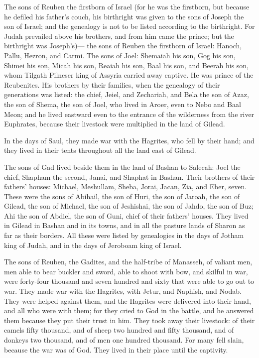  The sons of Reuben the firstborn of Israel (for he was the
firstborn, but because he defiled his father's couch, his birthright was
given to the sons of Joseph the son of Israel; and the genealogy is not
to be listed according to the birthright.  For Judah
prevailed above his brothers, and from him came the prince; but the
birthright was Joseph's)---  the sons of Reuben the
firstborn of Israel: Hanoch, Pallu, Hezron, and Carmi.  The
sons of Joel: Shemaiah his son, Gog his son, Shimei his son,
 Micah his son, Reaiah his son, Baal his son, 
and Beerah his son, whom Tilgath Pilneser king of Assyria carried away
captive. He was prince of the Reubenites.  His brothers by
their families, when the genealogy of their generations was listed: the
chief, Jeiel, and Zechariah,  and Bela the son of Azaz, the
son of Shema, the son of Joel, who lived in Aroer, even to Nebo and Baal
Meon;  and he lived eastward even to the entrance of the
wilderness from the river Euphrates, because their livestock were
multiplied in the land of Gilead.

 In the days of Saul, they made war with the Hagrites, who
fell by their hand; and they lived in their tents throughout all the
land east of Gilead.

 The sons of Gad lived beside them in the land of Bashan to
Salecah:  Joel the chief, Shapham the second, Janai, and
Shaphat in Bashan.  Their brothers of their fathers'
houses: Michael, Meshullam, Sheba, Jorai, Jacan, Zia, and Eber, seven.
 These were the sons of Abihail, the son of Huri, the son
of Jaroah, the son of Gilead, the son of Michael, the son of Jeshishai,
the son of Jahdo, the son of Buz;  Ahi the son of Abdiel,
the son of Guni, chief of their fathers' houses.  They
lived in Gilead in Bashan and in its towns, and in all the pasture lands
of Sharon as far as their borders.  All these were listed
by genealogies in the days of Jotham king of Judah, and in the days of
Jeroboam king of Israel.

 The sons of Reuben, the Gadites, and the half-tribe of
Manasseh, of valiant men, men able to bear buckler and sword, able to
shoot with bow, and skilful in war, were forty-four thousand and seven
hundred and sixty that were able to go out to war.  They
made war with the Hagrites, with Jetur, and Naphish, and Nodab.
 They were helped against them, and the Hagrites were
delivered into their hand, and all who were with them; for they cried to
God in the battle, and he answered them because they put their trust in
him.  They took away their livestock: of their camels fifty
thousand, and of sheep two hundred and fifty thousand, and of donkeys
two thousand, and of men one hundred thousand.  For many
fell slain, because the war was of God. They lived in their place until
the captivity.


